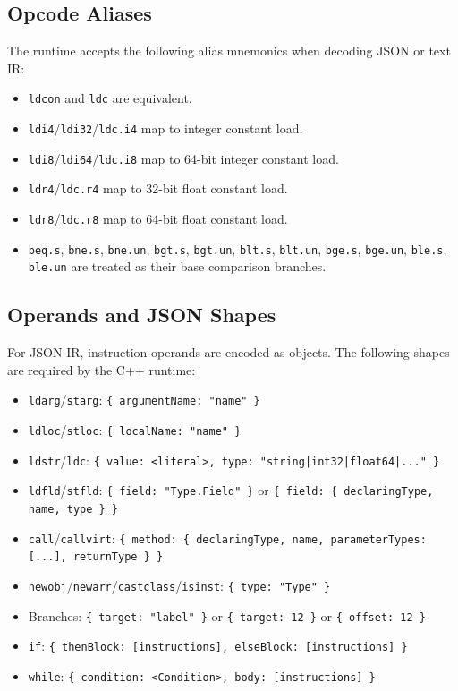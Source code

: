 \documentclass[11pt,a4paper]{article}
\begin{document}
	\subsection{Opcode Aliases}
	The runtime accepts the following alias mnemonics when decoding JSON or text IR:
	\begin{itemize}
		\item \texttt{ldcon} and \texttt{ldc} are equivalent.
		\item \texttt{ldi4}/\texttt{ldi32}/\texttt{ldc.i4} map to integer constant load.
		\item \texttt{ldi8}/\texttt{ldi64}/\texttt{ldc.i8} map to 64-bit integer constant load.
		\item \texttt{ldr4}/\texttt{ldc.r4} map to 32-bit float constant load.
		\item \texttt{ldr8}/\texttt{ldc.r8} map to 64-bit float constant load.
		\item \texttt{beq.s}, \texttt{bne.s}, \texttt{bne.un}, \texttt{bgt.s}, \texttt{bgt.un}, \texttt{blt.s}, \texttt{blt.un}, \texttt{bge.s}, \texttt{bge.un}, \texttt{ble.s}, \texttt{ble.un} are treated as their base comparison branches.
	\end{itemize}
	
	\subsection{Operands and JSON Shapes}
	For JSON IR, instruction operands are encoded as objects. The following shapes are required by the C++ runtime:
	\begin{itemize}
		\item \texttt{ldarg}/\texttt{starg}: \texttt{\{ argumentName: "name" \}}
		\item \texttt{ldloc}/\texttt{stloc}: \texttt{\{ localName: "name" \}}
		\item \texttt{ldstr}/\texttt{ldc}: \texttt{\{ value: <literal>, type: "string|int32|float64|..." \}}
		\item \texttt{ldfld}/\texttt{stfld}: \texttt{\{ field: "Type.Field" \}} or \texttt{\{ field: \{ declaringType, name, type \} \}}
		\item \texttt{call}/\texttt{callvirt}: \texttt{\{ method: \{ declaringType, name, parameterTypes: [...], returnType \} \}}
		\item \texttt{newobj}/\texttt{newarr}/\texttt{castclass}/\texttt{isinst}: \texttt{\{ type: "Type" \}}
		\item Branches: \texttt{\{ target: "label" \}} or \texttt{\{ target: 12 \}} or \texttt{\{ offset: 12 \}}
		\item \texttt{if}: \texttt{\{ thenBlock: [instructions], elseBlock: [instructions] \}}
		\item \texttt{while}: \texttt{\{ condition: <Condition>, body: [instructions] \}}
	\end{itemize}
	
\end{document}
